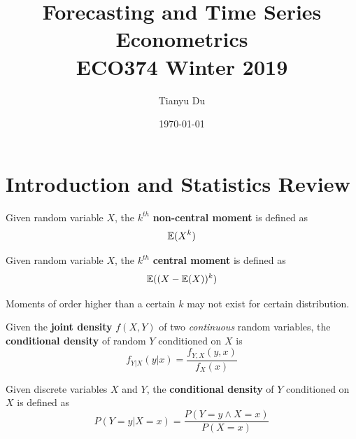 \documentclass[11pt]{article}
\title{Forecasting and Time Series Econometrics \\ ECO374 Winter 2019}
\date{\today}
\author{Tianyu Du}
\begin{document}
	\maketitle
	\tableofcontents
	
	\section{Introduction and Statistics Review}
		\begin{definition}
			Given random variable $X$, the $k^{th}$ \textbf{non-central moment} is defined as
			\begin{equation}
				\mathbb{E}({X^k})
			\end{equation}
		\end{definition}
		
		\begin{definition}
			Given random variable $X$, the $k^{th}$ \textbf{central moment} is defined as
			\begin{equation}
				\mathbb{E}({(X - \mathbb{E}({X}))^k})
			\end{equation}
		\end{definition}
		
		\begin{remark}
			Moments of order higher than a certain $k$ may not exist for certain distribution.
		\end{remark}
		
		\begin{definition}
			Given the \textbf{joint density} $f(X,Y)$ of two \emph{continuous} random variables, the \textbf{conditional density} of random $Y$ conditioned on $X$ is 
			\begin{equation}
				f_{Y|X}(y|x) = \frac{f_{Y,X}(y,x)}{f_X(x)}
			\end{equation}
		\end{definition}
		
		\begin{definition}
			Given discrete variables $X$ and $Y$, the \textbf{conditional density} of $Y$ conditioned on $X$ is defined as 
			\begin{equation}
				P(Y=y|X=x) = \frac{P(Y=y \land X=x)}{P(X=x)}
			\end{equation}
		\end{definition}
		
\end{document}

